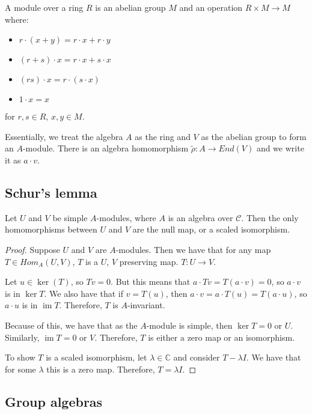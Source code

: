 \documentclass[]{report}
\theoremstyle{definition}
\numberwithin{theorem}{section}
\numberwithin{equation}{section}
\newcommand{\im}{\operatorname{im}}
\begin{document}
A module over a ring $R$ is an abelian group $M$ and an operation $R \times M \rightarrow M$ where:
\begin{itemize}
	\item $r \cdot (x + y) = r \cdot x + r \cdot y$
	\item $(r + s) \cdot x = r \cdot x + s \cdot x$
	\item $(rs )\cdot x = r \cdot (s \cdot x)$
	\item $1 \cdot x = x$
\end{itemize}
for $r, s \in R$, $x, y \in M$.

Essentially, we treat the algebra $A$ as the ring and $V$ as the abelian group to form an $A$-module. There is an algebra homomorphism $\tilde{\rho}: A \rightarrow End(V)$ and we write it as $a \cdot v$. 


\subsection{Schur's lemma}
Let $U$ and $V$ be simple $A$-modules, where $A$ is an algebra over $\mathcal{C}$. Then the only homomorphisms between $U$ and $V$ are the null map, or a scaled isomorphism.

\begin{proof}
	Suppose $U$ and $V$ are $A$-modules. Then we have that for any map $T \in Hom_A(U, V)$, $T$ is a $U$, $V$ preserving map. $T : U \rightarrow V$.
	
	Let $u \in \ker(T)$, so $T v = 0$. But this means that $a \cdot T v = T (a \cdot v) = 0$, so $a \cdot v$ is in $\ker T$. We also have that if $v = T (u)$, then $a \cdot v = a \cdot T(u) = T( a \cdot u)$, so $a \cdot u$ is in $\im T$. Therefore, $T$ is $A$-invariant.
	
	Because of this, we have that as the $A$-module is simple, then $\ker T = 0$ or $U$. Similarly, $\im T = 0$ or $V$. Therefore, $T$ is either a zero map or an isomorphism.
	
	To show $T$ is a scaled isomorphism, let $\lambda \in \mathbb{C}$ and consider $T - \lambda I$. We have that for some $\lambda$ this is a zero map. Therefore, $T = \lambda I$. 
\end{proof}

\subsection{Group algebras}
\end{document}

